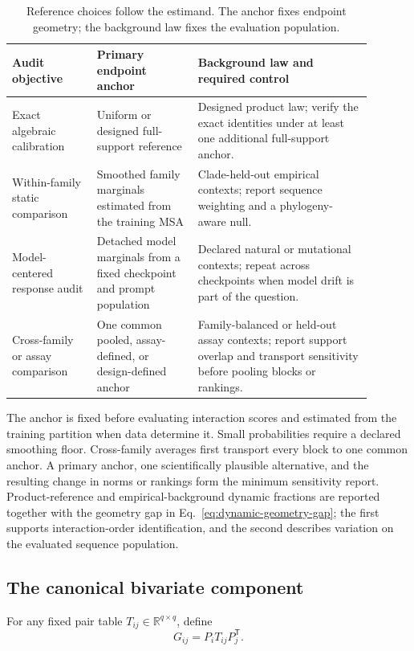 \documentclass[10pt]{article}
\newcommand{\R}{\mathbb R}
\theoremstyle{definition}
\theoremstyle{remark}
\newcommand{\BookSection}[1]{\subsection{#1}}
\begin{document}
\begin{table}[htbp]
\centering
\small
\begin{tabular}{@{}>{\raggedright\arraybackslash}p{0.21\linewidth}
                >{\raggedright\arraybackslash}p{0.25\linewidth}
                >{\raggedright\arraybackslash}p{0.43\linewidth}@{}}
\toprule
Audit objective & Primary endpoint anchor & Background law and required control \\
\midrule
Exact algebraic calibration & Uniform or designed full-support reference & Designed product law;
verify the exact identities under at least one additional full-support anchor. \\
Within-family static comparison & Smoothed family marginals estimated from the training MSA &
Clade-held-out empirical contexts; report sequence weighting and a phylogeny-aware null. \\
Model-centered response audit & Detached model marginals from a fixed checkpoint and prompt
population & Declared natural or mutational contexts; repeat across checkpoints when model drift is
part of the question. \\
Cross-family or assay comparison & One common pooled, assay-defined, or design-defined anchor &
Family-balanced or held-out assay contexts; report support overlap and transport sensitivity before
pooling blocks or rankings. \\
\bottomrule
\end{tabular}
\caption{Reference choices follow the estimand.  The anchor fixes endpoint geometry; the background
law fixes the evaluation population.}
\label{tab:reference-choice}
\end{table}

The anchor is fixed before evaluating interaction scores and estimated from the training partition
when data determine it.  Small probabilities require a declared smoothing floor.  Cross-family
averages first transport every block to one common anchor.  A primary anchor, one scientifically
plausible alternative, and the resulting change in norms or rankings form the minimum sensitivity
report.  Product-reference and empirical-background dynamic fractions are reported together with
the geometry gap in Eq.~\ref{eq:dynamic-geometry-gap}; the first supports interaction-order
identification, and the second describes variation on the evaluated sequence population.

\BookSection{The canonical bivariate component}

For any fixed pair table $T_{ij}\in\R^{q\times q}$, define
\begin{equation}
\boxed{G_{ij}=P_iT_{ij}P_j^{\mathsf T}.}
\label{eq:canonical-gauge}
\end{equation}
\end{document}
